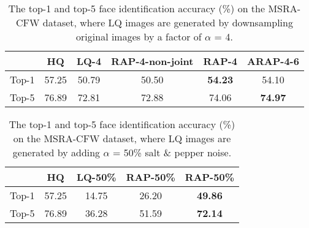 \documentclass[10pt,twocolumn,twoside]{IEEEtran} %
\begin{document}
\begin{table}
	\fontsize{10pt}{12pt}\selectfont
	\caption{The top-1 and top-5 face identification accuracy (\%) on the MSRA-CFW dataset, where LQ images are generated by downsampling original images by a factor of $\alpha$ = 4.}
	\begin{center}
		\begin{tabular}{@{\hskip 1mm}c@{\hskip 1mm}|@{\hskip 1mm}c@{\hskip 1mm}|@{\hskip 1mm}c@{\hskip 1mm}|@{\hskip 1mm}c@{\hskip 1mm}|@{\hskip 1mm}c@{\hskip 1mm}|@{\hskip 1mm}c@{\hskip 1mm}}
			\hline
			& HQ & LQ-4 & RAP-4-non-joint & RAP-4 & ARAP-4-6\\ \hline
			\hline
			Top-1  & 57.25 & 50.79 & 50.50 & \textbf{54.23} & 54.10\\ 
			Top-5  & 76.89 & 72.81 & 72.88 & 74.06 & \textbf{74.97}\\ \hline
		\end{tabular}
	\end{center}
	
	\label{msralr}
\end{table}\begin{table}
	\fontsize{10pt}{12pt}\selectfont
	\caption{The top-1 and top-5 face identification accuracy (\%) on the MSRA-CFW dataset, where LQ images are generated by adding $\alpha$ = 50\% salt \& pepper noise.}
	\begin{center}
		\begin{tabular}{c|c|c|c|c}
			\hline
			& HQ & LQ-50\% & RAP-50\% & RAP-50\% \\ \hline
			\hline
			Top-1  & 57.25 & 14.75 & 26.20 & \textbf{49.86} \\ 
			Top-5  & 76.89 & 36.28 & 51.59 & \textbf{72.14} \\ \hline
		\end{tabular}
	\end{center}
	

\end{table}
\end{document}
